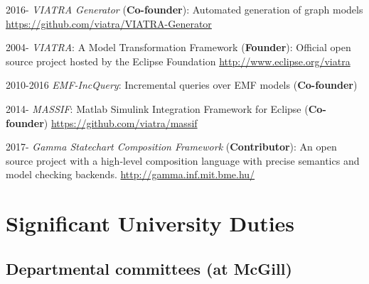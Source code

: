 \begin{yearlist}
\item[2016-] \emph{VIATRA Generator} (\textbf{Co-founder}): Automated generation of graph models \newline \url{https://github.com/viatra/VIATRA-Generator} 

\item[2004-] \emph{VIATRA}: A Model Transformation Framework (\textbf{Founder}): Official open source project hosted by the Eclipse Foundation \newline \url{http://www.eclipse.org/viatra} 

\item[2010-2016] \emph{EMF-IncQuery}: Incremental queries over EMF models (\textbf{Co-founder}) 

\item[2014-] \emph{MASSIF}: Matlab Simulink Integration Framework for Eclipse (\textbf{Co-founder}) \newline 
\url{https://github.com/viatra/massif} 

\item[2017-] \emph{Gamma Statechart Composition Framework} (\textbf{Contributor}): An open source project with a high-level composition language with precise semantics and model checking backends. \newline \url{http://gamma.inf.mit.bme.hu/} 

\end{yearlist}


\section{Significant University Duties}

\subsection{Departmental committees (at McGill)}

